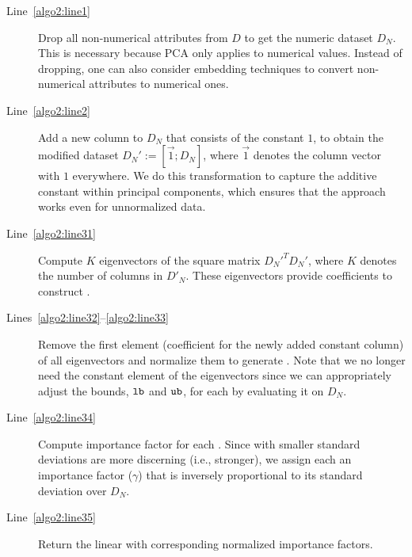 \begin{description}
    \item[Line~\ref{algo2:line1}] Drop all non-numerical attributes from $D$ to
    get the numeric dataset $D_N$. This is necessary because PCA only applies
    to numerical values. Instead of dropping, one can also consider embedding
    techniques to convert non-numerical attributes to numerical ones.

    \item[Line~\ref{algo2:line2}] Add a new column to $D_N$ that consists of
    the constant $1$, to obtain the modified dataset $D_N' := [\vec{1} ; D_N]$,
    where $\vec{1}$ denotes the column vector with $1$ everywhere. We do this
    transformation to capture the additive constant within principal
    components, which ensures that the approach works even for unnormalized
    data.

    \item[Line~\ref{algo2:line31}] Compute $K$ eigenvectors of the square
    matrix ${D_N'}^{T}D_N'$, where $K$ denotes the number of columns in $D'_N$.
	These eigenvectors provide coefficients to construct \views.

    \item[Lines~\ref{algo2:line32}--\ref{algo2:line33}] Remove the first
    element (coefficient for the newly added constant column) of all
    eigenvectors and normalize them to generate \views. Note that we no longer
    need the constant element of the eigenvectors since we can appropriately
    adjust the bounds, ${\mathtt{lb}}$ and ${\mathtt{ub}}$, for each \view by evaluating it on
    $D_N$.

    \item[Line~\ref{algo2:line34}] Compute importance factor for each \view.
    Since \views with smaller standard deviations are more discerning (i.e.,
    stronger), we assign each \view an importance factor ($\gamma$) that is
    inversely proportional to its standard deviation over $D_N$.

    \item[Line~\ref{algo2:line35}] Return the linear \views with corresponding
    normalized importance factors.

\end{description}
